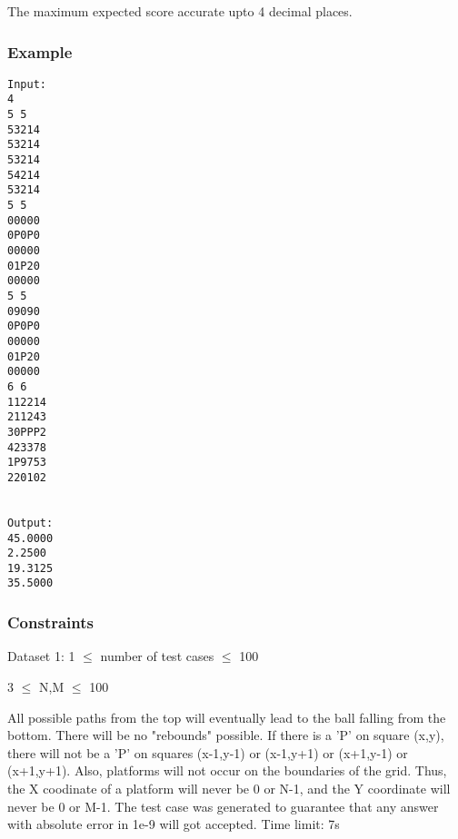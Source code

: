    The maximum expected score accurate upto 4 decimal places.  

\subsubsection{   Example  }
\begin{verbatim}
Input:
4
5 5
53214
53214
53214
54214
53214
5 5
00000
0P0P0
00000
01P20
00000
5 5
09090
0P0P0
00000
01P20
00000
6 6
112214
211243
30PPP2
423378
1P9753
220102


Output:
45.0000
2.2500
19.3125
35.5000

\end{verbatim}

\subsubsection{   Constraints  }

   Dataset 1: 1  $\le$  number of test cases  $\le$  100  

   3  $\le$  N,M  $\le$  100  

   All possible paths from the top will eventually lead to the ball falling from the bottom. There will be no "rebounds" possible. If there is a 'P' on square (x,y), there will not be a 'P' on squares (x-1,y-1) or (x-1,y+1) or (x+1,y-1) or (x+1,y+1). Also, platforms will not occur on the boundaries of the grid. Thus, the X coodinate of a platform will never be 0 or N-1, and the Y coordinate will never be 0 or M-1. The test case was generated to guarantee that any answer with absolute error in 1e-9 will got accepted. Time limit: 7s  
